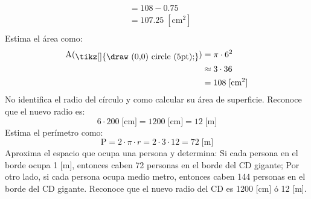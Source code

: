 \documentclass{cdplf-pauta}
\begin{document}
\begin{multicols}{3}
\begin{align*}
                        &= 108 - 0.75 \\
                        &= 107.25 \; [\textrm{cm}^2] \\
\end{align*}
\competente
[1-3 puntos] Estima el área como:
\setlength{\belowdisplayskip}{0pt}
\setlength{\belowdisplayshortskip}{0pt}
\begin{align*}
    \mathrm{A}(\raisebox{-2.5pt}{\tikz[]{\draw (0,0) circle (5pt);}}) &= \pi\cdot 6^2\\
                        &\approx 3\cdot 36 \\
                        &= 108 \; [\textrm{cm}^2] \\
\end{align*}
\insuficiente
[0 puntos] No identifica el radio del círculo y como calcular su área de superficie.
\pregunta
\destacado
[4-5 puntos] Reconoce que el nuevo radio es:
\setlength{\abovedisplayskip}{4pt}
\setlength{\abovedisplayshortskip}{4pt}
\setlength{\belowdisplayskip}{4pt}
\setlength{\belowdisplayshortskip}{4pt}
\begin{equation*}
    6\cdot 200 \;\textrm{[cm]} = 1200 \;\textrm{[cm]} = 12 \;\textrm{[m]}
\end{equation*}
Estima el perímetro como:
\setlength{\abovedisplayskip}{4pt}
\setlength{\abovedisplayshortskip}{4pt}
\setlength{\belowdisplayskip}{4pt}
\setlength{\belowdisplayshortskip}{4pt}
\begin{equation*}
    \mathrm{P} = 2\cdot \pi \cdot r = 2\cdot 3 \cdot 12 = 72 \;\textrm{[m]}
\end{equation*}
Aproxima el espacio que ocupa una persona y determina: Si cada persona en el borde 
ocupa 1 [m], entonces caben 72 personas en el borde del CD gigante; Por otro lado, si 
cada persona ocupa medio metro, entonces caben 144 personas en el borde del CD gigante. 
\competente
[1-3 puntos] Reconoce que el nuevo radio del CD es 1200 [cm] ó 12 [m]. 


\end{multicols}
\end{document}
